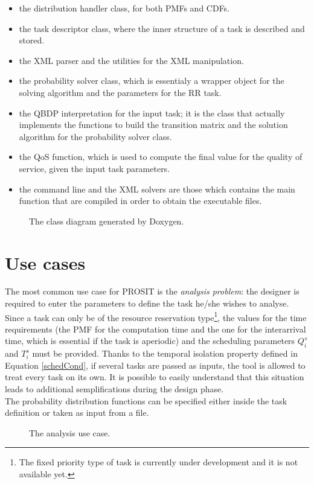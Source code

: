 \begin{itemize}
  \item the distribution handler class, for both PMFs and CDFs.
  \item the task descriptor class, where the inner structure of a task is described and stored.
  \item the XML parser and the utilities for the XML manipulation.
  \item the probability solver class, which is essentialy a wrapper object for the solving algorithm and the parameters for the RR task.
  \item the QBDP interpretation for the input task; it is the class that actually implements the functions to build the transition matrix and the solution algorithm for the probability solver class.
  \item the QoS function, which is used to compute the final value for the quality of service, given the input task parameters.
  \item the command line and the XML solvers are those which contains the main function that are compiled in order to obtain the executable files.
\end{itemize}

\begin{figure}[H]
  \caption{The class diagram generated by Doxygen.}
  \label{automaton}
\end{figure}

\section{Use cases}
The most common use case for PROSIT is the \emph{analysis problem}: the designer is required to enter the parameters to define the task he/she wishes to analyse.\\
Since a task can only be of  the resource reservation type\footnote{The fixed priority type of task is currently under development and it is not available yet.}, the values for the time requirements (the PMF for the computation time and the one for the interarrival time, which is essential if the task is aperiodic) and the scheduling parameters \( Q_{i}^s \) and \( T_{i}^s \) must be provided. Thanks to the temporal isolation property defined in Equation \ref{schedCond}, if several tasks are passed as inputs, the tool is allowed to treat every task on its own. It is possible to easily understand that this situation leads to additional semplifications during the design phase.\\ 
The probability distribution functions can be specified either inside the task definition or taken as input from a file.
\begin{figure}[H]
  \caption{The analysis use case.}
  \label{usecase}
\end{figure}

